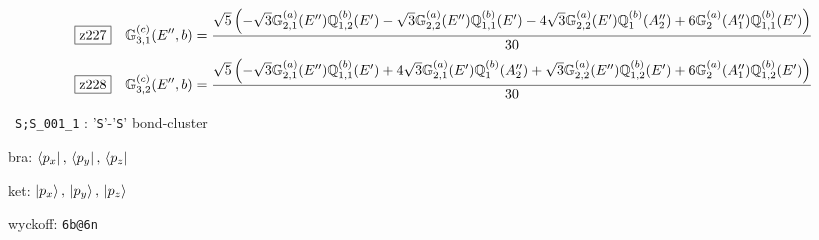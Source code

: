 \documentclass[fleqn,10pt,landscape]{jsarticle}
\begin{document}
\begin{dmath*}
\hspace*{3mm}\fbox{z227}\quad \mathbb{G}_{3,1}^{(c)}(E^{\prime\prime},b)=\frac{\sqrt{5} \left(- \sqrt{3} \mathbb{G}_{2,1}^{(a)}(E^{\prime\prime}) \mathbb{Q}_{1,2}^{(b)}(E^{\prime}) - \sqrt{3} \mathbb{G}_{2,2}^{(a)}(E^{\prime\prime}) \mathbb{Q}_{1,1}^{(b)}(E^{\prime}) - 4 \sqrt{3} \mathbb{G}_{2,2}^{(a)}(E^{\prime}) \mathbb{Q}_{1}^{(b)}(A_{2}^{\prime\prime}) + 6 \mathbb{G}_{2}^{(a)}(A_{1}^{\prime\prime}) \mathbb{Q}_{1,1}^{(b)}(E^{\prime})\right)}{30}
\end{dmath*}
\begin{dmath*}
\hspace*{3mm}\fbox{z228}\quad \mathbb{G}_{3,2}^{(c)}(E^{\prime\prime},b)=\frac{\sqrt{5} \left(- \sqrt{3} \mathbb{G}_{2,1}^{(a)}(E^{\prime\prime}) \mathbb{Q}_{1,1}^{(b)}(E^{\prime}) + 4 \sqrt{3} \mathbb{G}_{2,1}^{(a)}(E^{\prime}) \mathbb{Q}_{1}^{(b)}(A_{2}^{\prime\prime}) + \sqrt{3} \mathbb{G}_{2,2}^{(a)}(E^{\prime\prime}) \mathbb{Q}_{1,2}^{(b)}(E^{\prime}) + 6 \mathbb{G}_{2}^{(a)}(A_{1}^{\prime\prime}) \mathbb{Q}_{1,2}^{(b)}(E^{\prime})\right)}{30}
\end{dmath*}
\vspace{5mm}

\noindent\textbullet\, \texttt{S;S_001_1} : '\texttt{S}'-'\texttt{S}' bond-cluster

\noindent\quad * bra: $\bra{p_{x}},\, \bra{p_{y}},\, \bra{p_{z}}$

\noindent\quad * ket: $\ket{p_{x}},\, \ket{p_{y}},\, \ket{p_{z}}$

\noindent\quad * wyckoff: \texttt{6b@6n}
\end{document}
